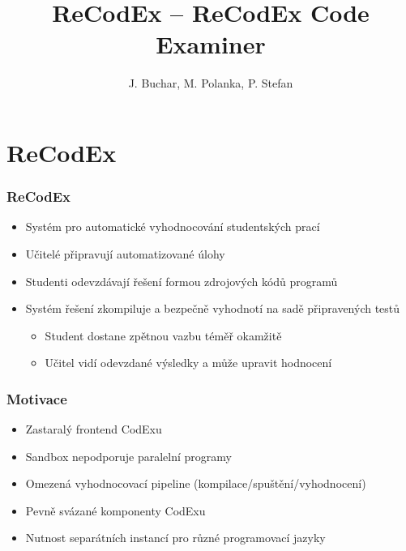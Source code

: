 \documentclass{beamer}
\begin{document}

\title[ReCodEx -- ReCodEx Code Examiner] %
{ReCodEx -- ReCodEx Code Examiner}
\author[Buchar, Polanka, Stefan]{J. Buchar, M. Polanka, P. Stefan}
\date[30. 1. 2018]{} %
\subject{Computer Science}

\frame{\titlepage}

\section{ReCodEx}

\begin{frame}
	\frametitle{ReCodEx}
	\begin{itemize}
		\item Systém pro automatické vyhodnocování studentských prací
		\item Učitelé připravují automatizované úlohy
		\item Studenti odevzdávají řešení formou zdrojových kódů programů
		\item Systém řešení zkompiluje a bezpečně vyhodnotí na sadě připravených testů
		\begin{itemize}
			\item Student dostane zpětnou vazbu téměř okamžitě
			\item Učitel vidí odevzdané výsledky a může upravit hodnocení
		\end{itemize}
	\end{itemize}
\end{frame}

\begin{frame}
	\frametitle{Motivace}
	\begin{itemize}
		\item Zastaralý frontend CodExu
		\item Sandbox nepodporuje paralelní programy
		\item Omezená vyhodnocovací pipeline (kompilace/spuštění/vyhodnocení)
		\item Pevně svázané komponenty CodExu
		\item Nutnost separátních instancí pro různé programovací jazyky
	\end{itemize}
\end{frame}
\end{document}
